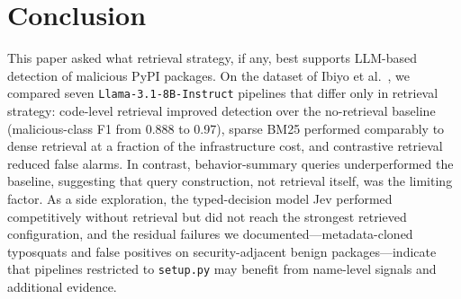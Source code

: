\section{Conclusion}
\label{sec:conclusion}

This paper asked what retrieval strategy, if any, best supports LLM-based
detection of malicious PyPI packages. On the dataset of
Ibiyo et al.~\cite{ease2025rag}, we compared seven \texttt{Llama-3.1-8B-Instruct}
pipelines that differ only in retrieval strategy: code-level retrieval
improved detection over the no-retrieval baseline (malicious-class F1 from
0.888 to 0.97), sparse BM25 performed comparably to dense retrieval at a
fraction of the infrastructure cost, and contrastive retrieval reduced false
alarms. In contrast, behavior-summary queries underperformed the baseline,
suggesting that query construction, not retrieval itself, was the limiting
factor. As a side exploration, the typed-decision model Jev performed
competitively without retrieval but did not reach the strongest retrieved
configuration, and the residual failures we documented---metadata-cloned
typosquats and false positives on security-adjacent benign
packages---indicate that pipelines restricted to \texttt{setup.py} may
benefit from name-level signals and additional evidence.
\endinput

